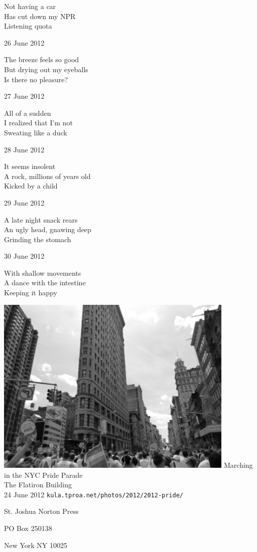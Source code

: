 \documentclass[12pt]{article}
\begin{document}
Not having a car \\
Has cut down my NPR \\
Listening quota

26 June 2012

The breeze feels so good \\
But drying out my eyeballs \\
Is there no pleasure?

27 June 2012

All of a sudden \\
I realized that I'm not \\
Sweating like a duck

28 June 2012

It seems insolent \\
A rock, millions of years old \\
Kicked by a child

29 June 2012

A late night snack rears \\
An ugly head, gnawing deep \\
Grinding the stomach

30 June 2012

With shallow movements \\
A dance with the intestine \\
Keeping it happy

\newpage

\begin{center}
\includegraphics[width=325pt]{pride.png}
Marching in the NYC Pride Parade \\
The Flatiron Building \\
24 June 2012
{\tt kula.tproa.net/photos/2012/2012-pride/ }

\end{center}

\newpage

\thispagestyle{empty}
\vspace*{12cm}
\begin{sideways}
\Large{St. Joshua Norton Press}
\end{sideways}
\begin{sideways}
\Large{PO Box 250138}
\end{sideways}
\begin{sideways}
\Large{New York NY 10025}
\end{sideways}
\end{document}
